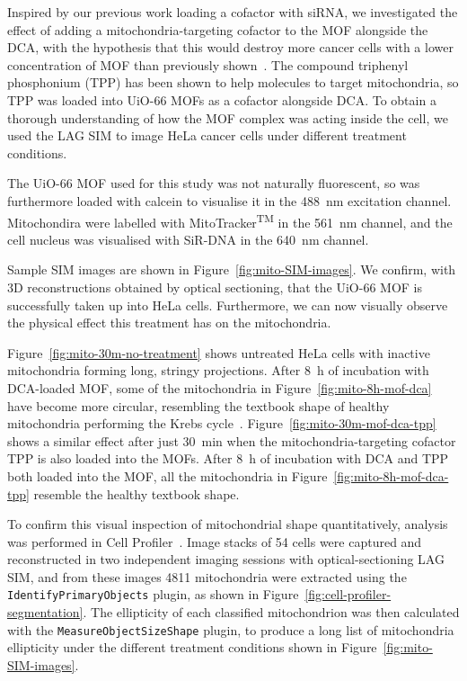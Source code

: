 Inspired by our previous work loading a cofactor with siRNA, we investigated the effect of adding a mitochondria-targeting cofactor to the MOF alongside the DCA, with the hypothesis that this would destroy more cancer cells with a lower concentration of MOF than previously shown~\cite{abanades2018mechanistic}. 
The compound triphenyl phosphonium (TPP) has been shown to help molecules to target mitochondria, so TPP was loaded into UiO-66 MOFs as a cofactor alongside DCA. 
To obtain a thorough understanding of how the MOF complex was acting inside the cell, we used the LAG SIM to image HeLa cancer cells under different treatment conditions. 

The UiO-66 MOF used for this study was not naturally fluorescent, so was furthermore loaded with calcein to visualise it in the \SI{488}{\nano\metre} excitation channel. 
Mitochondira were labelled with MitoTracker\textsuperscript{TM} in the \SI{561}{\nano\metre} channel, and the cell nucleus was visualised with SiR-DNA in the \SI{640}{\nano\metre} channel. 

Sample SIM images are shown in Figure~\ref{fig:mito-SIM-images}. 
We confirm, with 3D reconstructions obtained by optical sectioning, that the UiO-66 MOF is successfully taken up into HeLa cells. %
Furthermore, we can now visually observe the physical effect this treatment has on the mitochondria. 

Figure~\ref{fig:mito-30m-no-treatment} shows untreated HeLa cells with inactive mitochondria forming long, stringy projections. 
After \SI{8}{\hour} of incubation with DCA-loaded MOF, some of the mitochondria in Figure~\ref{fig:mito-8h-mof-dca} have become more circular, resembling the textbook shape of healthy mitochondria performing the Krebs cycle~\cite{murray1993cell}.
Figure~\ref{fig:mito-30m-mof-dca-tpp} shows a similar effect after just \SI{30}{\minute} when the mitochondria-targeting cofactor TPP is also loaded into the MOFs. 
After \SI{8}{\hour} of incubation with DCA and TPP both loaded into the MOF, all the mitochondria in Figure~\ref{fig:mito-8h-mof-dca-tpp} resemble the healthy textbook shape. 

To confirm this visual inspection of mitochondrial shape quantitatively, analysis was performed in Cell Profiler~\cite{carpenter2006cellprofiler}.
Image stacks of 54 cells were captured and reconstructed in two independent imaging sessions with optical-sectioning LAG SIM, and from these images \num{4811} mitochondria were extracted using the \texttt{IdentifyPrimaryObjects} plugin, as shown in Figure~\ref{fig:cell-profiler-segmentation}. 
The ellipticity of each classified mitochondrion was then calculated with the \texttt{MeasureObjectSizeShape} plugin, to produce a long list of mitochondria ellipticity under the different treatment conditions shown in Figure~\ref{fig:mito-SIM-images}. 

